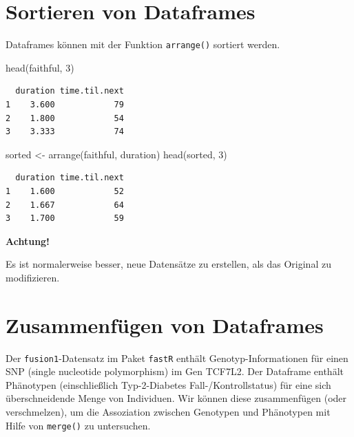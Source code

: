 \documentclass[
  ngerman,
]{scrbook}
\newenvironment{Shaded}{\begin{snugshade}}{\end{snugshade}}
\newcommand{\DecValTok}[1]{\textcolor[rgb]{0.00,0.00,0.81}{#1}}
\newcommand{\FunctionTok}[1]{\textcolor[rgb]{0.00,0.00,0.00}{#1}}
\newcommand{\NormalTok}[1]{#1}
\newcommand{\OtherTok}[1]{\textcolor[rgb]{0.56,0.35,0.01}{#1}}
\newenvironment{achtung}[1]
  {
  \begin{itemize}
  \renewcommand{\labelitemi}{
    \raisebox{1.8\height}[0pt][0pt]{
      {\setkeys{Gin}{width=7em,keepaspectratio}
        {\Large \textcolor{dark-fom-green}\faExclamationCircle}}
        }
  }
  \begin{blackbox}
        \bgroup\color{dark-fom-green}
          {\textbf{Achtung!}}
        \egroup
  \item
  }
  {
  \end{blackbox}
  \end{itemize}
  }
\begin{document}
\hypertarget{sortieren-von-dataframes}{%
\section{Sortieren von Dataframes}\label{sortieren-von-dataframes}}

Dataframes können mit der Funktion \texttt{arrange()} sortiert werden.

\begin{Shaded}
\begin{Highlighting}[]
\FunctionTok{head}\NormalTok{(faithful, }\DecValTok{3}\NormalTok{)}
\end{Highlighting}
\end{Shaded}

\begin{verbatim}
  duration time.til.next
1    3.600            79
2    1.800            54
3    3.333            74
\end{verbatim}

\begin{Shaded}
\begin{Highlighting}[]
\NormalTok{sorted }\OtherTok{\textless{}{-}} \FunctionTok{arrange}\NormalTok{(faithful, duration)}
\FunctionTok{head}\NormalTok{(sorted, }\DecValTok{3}\NormalTok{)}
\end{Highlighting}
\end{Shaded}

\begin{verbatim}
  duration time.til.next
1    1.600            52
2    1.667            64
3    1.700            59
\end{verbatim}

\begin{achtung}{achtung}
Es ist normalerweise besser, neue Datensätze zu erstellen, als das Original zu modifizieren.

\end{achtung}

\hypertarget{zusammenfuxfcgen-von-dataframes}{%
\section{Zusammenfügen von Dataframes}\label{zusammenfuxfcgen-von-dataframes}}

Der \texttt{fusion1}-Datensatz im Paket \texttt{fastR} enthält Genotyp-Informationen für einen \textsc{SNP} (single nucleotide polymorphism) im Gen \textsc{TCF7L2}. Der Dataframe enthält Phänotypen (einschließlich Typ-2-Diabetes Fall-/Kontrollstatus) für eine sich überschneidende Menge von Individuen. Wir können diese zusammenfügen (oder verschmelzen), um die Assoziation zwischen Genotypen und Phänotypen mit Hilfe von \texttt{merge()} zu untersuchen.
\end{document}

